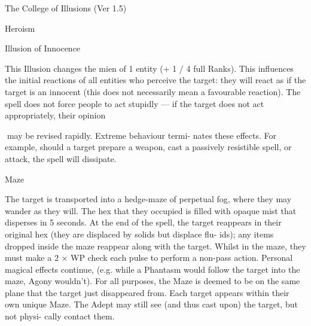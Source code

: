\begin{Chapter}{The College of Illusions (Ver 1.5)}
\begin{spell}[S-8]{Heroism }
\begin{effects}
\end{effects}
\end{spell}

\begin{spell}[S-9]{Illusion of Innocence }

\begin{effects}
 This  Illusion  changes  the  mien  of  1  entity 
(+  1  /  4  full  Ranks).  This  influences  the  initial 
reactions  of  all  entities  who  perceive  the  target: 
they  will  react  as  if  the  target  is  an  innocent  (this 
does  not  necessarily  mean  a  favourable  reaction). 
The spell does not force people to act stupidly — if 
the  target  does  not  act appropriately,  their  opinion 

may  be  revised  rapidly.  Extreme  behaviour  termi-
nates  these  effects.  For  example,  should  a  target 
prepare  a  weapon,  cast  a passively  resistible  spell, 
or attack, the spell will dissipate. 

\end{effects}
\end{spell}

\begin{spell}[S-10]{Maze }

\begin{effects}
The target is transported into a hedge-maze 
of  perpetual  fog,  where  they  may  wander  as  they 
will.  The  hex  that  they  occupied  is  filled  with 
opaque mist that disperses in 5 seconds. At the end 
of  the  spell,  the  target  reappears  in  their  original 
hex  (they  are  displaced  by  solids  but  displace  flu-
ids);  any  items  dropped  inside  the  maze  reappear 
along  with  the  target.  Whilst  in  the  maze,  they 
must make a 2 × WP check each pulse to perform a 
non-pass action. Personal magical effects continue, 
(e.g. while a Phantasm would follow the target into 
the  maze,  Agony  wouldn’t).  For  all  purposes,  the 
Maze  is  deemed  to  be  on  the  same  plane  that  the 
target  just  disappeared  from.  Each  target  appears 
within their own unique Maze. The Adept may still 
see  (and  thus  cast  upon)  the  target,  but  not  physi-
cally contact them. 


\end{effects}
\end{spell}
\end{Chapter}

